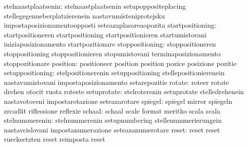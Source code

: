              stelnaastplaatsenin: stelnaastplaatsenin              setupoppositeplacing
                                  stellegegenueberplatzierenein    nastavumisteniprotejsku
                                  impostaposizionamentoopposti     seteazaplasareaopozita
                startpositioning: startpositioneren                startpositioning
                                  startpositionieren               startumistovani
                                  iniziaposizionamento             startpozitionare
                 stoppositioning: stoppositioneren                 stoppositioning
                                  stoppositionieren                stopumistovani
                                  terminaposizionamento            stoppozitionare
                        position: positioneer                      position
                                  position                         pozice
                                  posizione                        pozitie
                setuppositioning: stelpositionerenin               setuppositioning
                                  stellepositionierenein           nastavumistovani
                                  impostaposizionamento            setarepozitie
                          rotate: roteer                           rotate
                                  drehen                           otocit
                                  ruota                            roteste %
                     setuprotate: stelroterenin                    setuprotate
                                  stelledrehenein                  nastavotoceni
                                  impostarotazione                 seteazarotare
                         spiegel: spiegel                          mirror
                                  spiegeln                         zrcadlit
                                  riflessione                      reflexie
                          schaal: schaal                           scale
                                  format                           meritko
                                  scala                            scala %
                  stelnummerenin: stelnummerenin                   setupnumbering
                                  stellenummerierungein            nastavcislovani
                                  impostanumerazione               seteazanumerotare
                           reset: reset                            reset
                                  ruecksetzten                     reset
                                  reimposta                        reset
